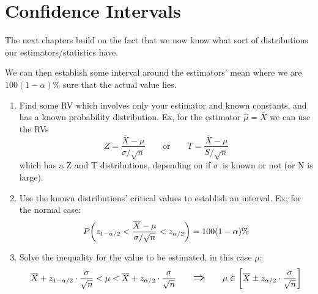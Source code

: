 \documentclass[12p,a4paper]{report}
\renewcommand{\bar}{\overline}
\newcommand{\lRightarrow}{\mathlarger{\mathlarger{\Rightarrow}}}
\begin{document}
\newpage
\chapter{Confidence Intervals}
The next chapters build on the fact that we now know what sort of distributions our estimators/statistics have. 

We can then establish some interval around the estimators' mean where we are $100(1-\alpha)\%$ sure that the actual value lies.

\begin{tcolorbox}[width=\textwidth,colback={yellow},title={Deriving Confidence Intervals},colbacktitle=green,coltitle=black,fonttitle=\Large]

    \begin{enumerate}
        \item Find some RV which involves only your estimator and known constants, and has a known probability distribution. Ex, for the estimator $\hat{\mu} = \bar{X}$ we can use the RVs
        \[ Z = \frac{\bar{X} - \mu}{\sigma/\sqrt{n}}
        \quad\quad \text{or} \quad\quad
        T = \frac{\bar{X} - \mu}{S/\sqrt{n}} \]
        which has a Z and T distributions, depending on if $\sigma$ is known or not (or N is large).

        \item Use the known distributions' critical values to establish an interval. Ex; for the normal case:
        \[ P\qty(z_{1 - \alpha/2} < \frac{\bar{X} - \mu}{\sigma/\sqrt{n}} < z_{\alpha/2}) = 100(1-\alpha)\% \]

        \item Solve the inequality for the value to be estimated, in this case $\mu$:
        \[ \bar{X} + z_{1-\alpha/2}\cdot \frac{\sigma}{\sqrt{n}} < \mu < \bar{X} + z_{\alpha/2}\cdot \frac{\sigma}{\sqrt{n}} \quad\quad \lRightarrow \quad\quad \mu \in \qty[\bar{X} \pm z_{\alpha/2}\cdot \frac{\sigma}{\sqrt{n}}] \]
    \end{enumerate}

\end{tcolorbox}  
\end{document}
